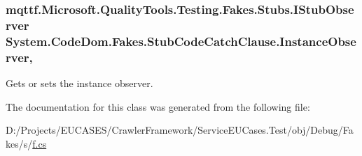 \hypertarget{class_system_1_1_code_dom_1_1_fakes_1_1_stub_code_catch_clause_abbc970da4aa9affdbeb7d01b5bc76836}{
\subsubsection[{Instance\-Observer}]{\setlength{\rightskip}{0pt plus 5cm}mqttf.\-Microsoft.\-Quality\-Tools.\-Testing.\-Fakes.\-Stubs.\-I\-Stub\-Observer System.\-Code\-Dom.\-Fakes.\-Stub\-Code\-Catch\-Clause.\-Instance\-Observer\hspace{0.3cm}{\ttfamily [get]}, {\ttfamily [set]}}}\label{class_system_1_1_code_dom_1_1_fakes_1_1_stub_code_catch_clause_abbc970da4aa9affdbeb7d01b5bc76836}


Gets or sets the instance observer.



The documentation for this class was generated from the following file\-:\begin{DoxyCompactItemize}
\item 
D\-:/\-Projects/\-E\-U\-C\-A\-S\-E\-S/\-Crawler\-Framework/\-Service\-E\-U\-Cases.\-Test/obj/\-Debug/\-Fakes/s/\hyperlink{s_2f_8cs}{f.\-cs}\end{DoxyCompactItemize}
